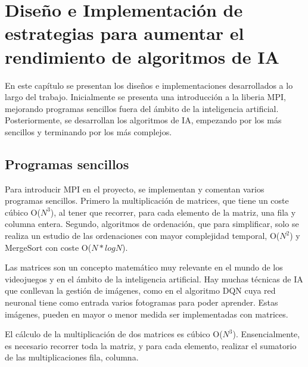 

\chapter{Diseño e Implementación de estrategias para aumentar el rendimiento de algoritmos de IA}
\label{cap:c3_implementaciones}	


	
	En este capítulo se presentan los diseños e implementaciones desarrollados a lo largo del trabajo. Inicialmente se presenta una introducción a la liberia MPI, mejorando programas sencillos fuera del ámbito de la inteligencia artificial. Posteriormente, se desarrollan los algoritmos de IA, empezando por los más sencillos y terminando por los más complejos.

\section{Programas sencillos}
\label{cap:c3_1}

	Para introducir MPI en el proyecto, se implementan y comentan varios programas sencillos. Primero la multiplicación de matrices, que tiene un coste cúbico O(\(N^{3}\)), al tener que recorrer, para cada elemento de la matriz, una fila y columna entera. Segundo, algoritmos de ordenación, que para simplificar, solo se realiza un estudio de las ordenaciones con mayor complejidad temporal, O(\(N^{2}\)) y MergeSort con coste O(\(N*logN\)).


	Las matrices son un concepto matemático muy relevante en el mundo de los videojuegos y en el ámbito de la inteligencia artificial. Hay muchas técnicas de IA que conllevan la gestión de imágenes, como en el algoritmo DQN cuya red neuronal tiene como entrada varios fotogramas para poder aprender. Estas imágenes, pueden en mayor o menor medida ser implementadas con matrices.
	
	El cálculo de la multiplicación de dos matrices es cúbico O(\(N^{3}\)). Ensencialmente, es necesario recorrer toda la matriz, y para cada elemento, realizar el sumatorio de las multiplicaciones fila, columna. 
	
